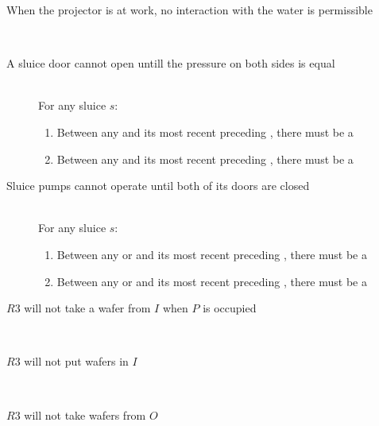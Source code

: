 \begin{description}
 \item[When the projector is at work, no interaction with the water is permissible] \hfill \\
 
 
 
 \item[A sluice door cannot open untill the pressure on both sides is equal] \hfill \\
 For any sluice $s$:
 \begin{enumerate}
  \item Between any  and its most recent preceding , there must be a 
  \item Between any  and its most recent preceding , there must be a 
 \end{enumerate}

 \item[Sluice pumps cannot operate until both of its doors are closed] \hfill \\
 For any sluice $s$:
 \begin{enumerate}
  \item Between any  or  and its most recent preceding , there must be a 
  \item Between any  or  and its most recent preceding , there must be a 
 \end{enumerate}

 \item[$R3$ will not take a wafer from $I$ when $P$ is occupied] \hfill \\
 
 \item[$R3$ will not put wafers in $I$] \hfill \\
 
 \item[$R3$ will not take wafers from $O$] \hfill \\
 
\end{description}
